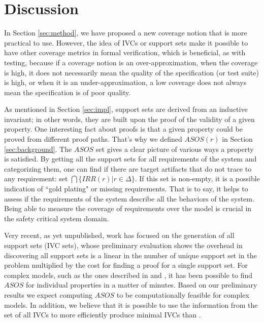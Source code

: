 \section{Discussion}
\label{sec:discussion}

In Section \ref{sec:method}, we have proposed a new coverage notion that
is more practical to use. However, the idea of IVCs or support sets make
it possible to have other coverage metrics in formal verification, which is beneficial, as with testing, because if a
coverage notion is an over-approximation, when the coverage
 is high, it does not necessarily mean the quality of
 the specification (or test suite) is high, or when it is an under-approximation, a low coverage does not always mean the specification is of poor quality.

 As mentioned in Section \ref{sec:impl}, support sets are derived from an inductive invariant; in other words, they are built upon the proof of the validity of a given property. One interesting fact about proofs
  is that a given property could be proved from different proof paths. That's why we defined $ASOS(r)$ in Section \ref{sec:background}. The $ASOS$ set gives a clear picture of various ways a property is satisfied. By getting all the support sets for all requirements of the system and categorizing them, one can find if there are target artifacts that do not trace to any requirement: set $\bigcap \{IRR (r) | r \in \Delta \}$.  If this set is non-empty, it is a possible indication of ``gold plating" or missing requirements. That is to say, it helps to assess if the requirements of the system describe all the behaviors of the system. Being able to measure the coverage of requirements over the model is crucial in the safety critical system domain.

Very recent, as yet unpublished, work has focused on the
generation of all support sets (IVC sets), whose preliminary evaluation
shows the overhead in discovering all support sets is a linear in the
number of unique support set in the problem multiplied by the cost
for finding a proof for a single support set. For complex models, such
as the ones described in \cite {QFCS15:backes} and \cite{hilt2013}, it has been possible to
find $ASOS$ for individual properties in a matter of minutes.
Based on our preliminary results we expect computing $ASOS$ to be computationally feasible for complex models. In
addition, we believe that it is possible to use the information
from the set of all IVCs to more efficiently produce minimal
IVCs than \ucbfalg.


